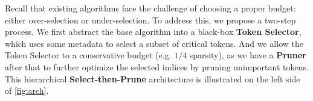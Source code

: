 

Recall that existing algorithms face the challenge of choosing a proper budget: either over-selection or under-selection. To address this, we propose a two-step process. We first abstract the base algorithm into a black-box \textbf{Token Selector}, which uses some metadata to select a subset of critical tokens. And we allow the Token Selector to a conservative budget (e.g. $1/4$ sparsity), as we have a \textbf{Pruner} after that to further optimize the selected indices by pruning unimportant tokens. This hierarchical \textbf{Select-then-Prune} architecture is illustrated on the left side of \autoref{fig:arch}.

